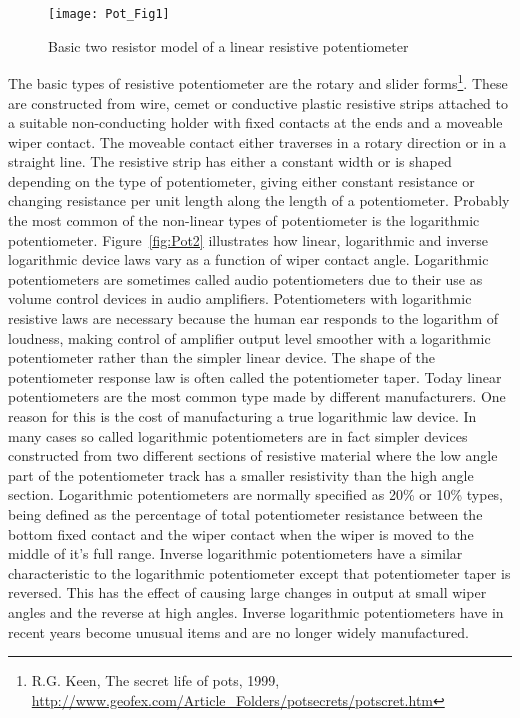 \begin{figure} [h]
  \centering
  \texttt{[image: Pot\_Fig1]}
  \caption{Basic two resistor model of a linear resistive potentiometer}
  \label{fig:Pot1}
\end{figure} 

The basic types of resistive potentiometer are the rotary and slider
forms\footnote{R.G. Keen, The secret life of pots, 1999,
\url{http://www.geofex.com/Article_Folders/potsecrets/potscret.htm}
}. These are constructed from wire, cemet or conductive plastic
resistive strips attached to a suitable non-conducting holder with
fixed contacts at the ends and a moveable wiper contact. The moveable
contact either traverses in a rotary direction or in a straight
line. The resistive strip has either a constant width or is shaped
depending on the type of potentiometer, giving either constant
resistance or changing resistance per unit length along the length of
a potentiometer. Probably the most common of the non-linear types of
potentiometer is the logarithmic potentiometer. Figure~\ref{fig:Pot2}
illustrates how linear, logarithmic and inverse logarithmic device
laws vary as a function of wiper contact angle. Logarithmic
potentiometers are sometimes called audio potentiometers due to their
use as volume control devices in audio amplifiers. Potentiometers with
logarithmic resistive laws are necessary because the human ear
responds to the logarithm of loudness, making control of amplifier
output level smoother with a logarithmic potentiometer rather than the
simpler linear device. The shape of the potentiometer response law is
often called the potentiometer taper. Today linear potentiometers are
the most common type made by different manufacturers. One reason for
this is the cost of manufacturing a true logarithmic law device. In
many cases so called logarithmic potentiometers are in fact simpler
devices constructed from two different sections of resistive material
where the low angle part of the potentiometer track has a smaller
resistivity than the high angle section. Logarithmic potentiometers
are normally specified as 20\% or 10\% types, being defined as the
percentage of total potentiometer resistance between the bottom fixed
contact and the wiper contact when the wiper is moved to the middle of
it's full range. Inverse logarithmic potentiometers have a similar
characteristic to the logarithmic potentiometer except that
potentiometer taper is reversed. This has the effect of causing large
changes in output at small wiper angles and the reverse at high
angles. Inverse logarithmic potentiometers have in recent years become
unusual items and are no longer widely manufactured.


